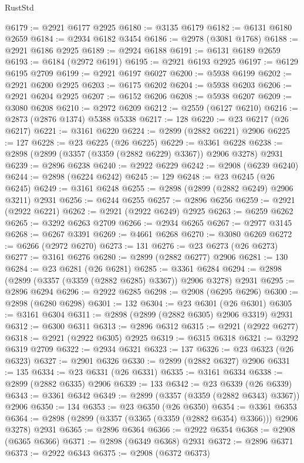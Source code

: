 \begin{lexlean}{RustStd}
\begin{coremodule}
@6179 := @2921 @6177 @2925
@6180 := @3135 @6179
@6182 := @6131 @6180 @2659
@6184 := @2934 @6182 @3454
@6186 := @2978 (@3081 @1768)
@6188 := @2921 @6186 @2925
@6189 := @2924 @6188
@6191 := @6131 @6189 @2659
@6193 := @6184 (@2972 @6191)
@6195 := @2921 @6193 @2925
@6197 := @6129 @6195 @2709
@6199 := @2921 @6197 @6027
@6200 := @5938 @6199
@6202 := @2921 @6200 @2925
@6203 := @6175 @6202
@6204 := @5938 @6203
@6206 := @2921 @6204 @2925
@6207 := @6152 @6206
@6208 := @5938 @6207
@6209 := @3080 @6208
@6210 := @2972 @6209
@6212 := @2559 (@6127 @6210)
@6216 := @2873 (@2876 @1374) @5388 @5338
@6217 := 128
@6220 := @23 @6217 (@26 @6217)
@6221 := @3161 @6220
@6224 := @2899 (@2882 @6221) @2906
@6225 := 127
@6228 := @23 @6225 (@26 @6225)
@6229 := @3361 @6228
@6238 := @2898 (@2899 (@3357 (@3359 (@2882 @6229) @3367)) @2906 @3278) @2931
@6239 := @2896 @6238
@6240 := @2922 @6229
@6242 := @2908 (@6239 @6240)
@6244 := @2898 (@6224 @6242)
@6245 := 129
@6248 := @23 @6245 (@26 @6245)
@6249 := @3161 @6248
@6255 := @2898 (@2899 (@2882 @6249) @2906 @3211) @2931
@6256 := @6244 @6255
@6257 := @2896 @6256
@6259 := @2921 (@2922 @6221)
@6262 := @2921 (@2922 @6249) @2925
@6263 := @6259 @6262
@6265 := @3292 @6263 @2709
@6266 := @2934 @6265
@6267 := @2977 @3145
@6268 := @6267 @3391
@6269 := @4661 @6268
@6270 := @3080 @6269
@6272 := @6266 (@2972 @6270)
@6273 := 131
@6276 := @23 @6273 (@26 @6273)
@6277 := @3161 @6276
@6280 := @2899 (@2882 @6277) @2906
@6281 := 130
@6284 := @23 @6281 (@26 @6281)
@6285 := @3361 @6284
@6294 := @2898 (@2899 (@3357 (@3359 (@2882 @6285) @3367)) @2906 @3278) @2931
@6295 := @2896 @6294
@6296 := @2922 @6285
@6298 := @2908 (@6295 @6296)
@6300 := @2898 (@6280 @6298)
@6301 := 132
@6304 := @23 @6301 (@26 @6301)
@6305 := @3161 @6304
@6311 := @2898 (@2899 (@2882 @6305) @2906 @3319) @2931
@6312 := @6300 @6311
@6313 := @2896 @6312
@6315 := @2921 (@2922 @6277)
@6318 := @2921 (@2922 @6305) @2925
@6319 := @6315 @6318
@6321 := @3292 @6319 @2709
@6322 := @2934 @6321
@6323 := 137
@6326 := @23 @6323 (@26 @6323)
@6327 := @2901 @6326
@6330 := @2899 (@2882 @6327) @2906
@6331 := 135
@6334 := @23 @6331 (@26 @6331)
@6335 := @3161 @6334
@6338 := @2899 (@2882 @6335) @2906
@6339 := 133
@6342 := @23 @6339 (@26 @6339)
@6343 := @3361 @6342
@6349 := @2899 (@3357 (@3359 (@2882 @6343) @3367)) @2906
@6350 := 134
@6353 := @23 @6350 (@26 @6350)
@6354 := @3361 @6353
@6364 := @2898 (@2899 (@3357 (@3365 (@3359 (@2882 @6354) @3366))) @2906 @3278) @2931
@6365 := @2896 @6364
@6366 := @2922 @6354
@6368 := @2908 (@6365 @6366)
@6371 := @2898 (@6349 @6368) @2931
@6372 := @2896 @6371
@6373 := @2922 @6343
@6375 := @2908 (@6372 @6373)

\end{coremodule}
\end{lexlean}
